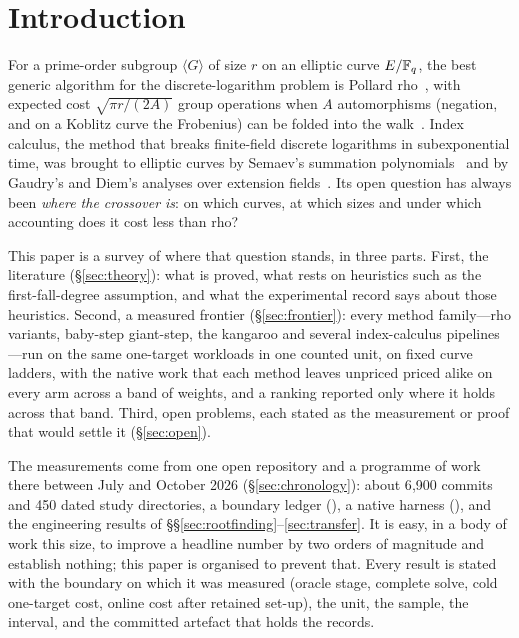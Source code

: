 \section{Introduction}\label{sec:intro}

For a prime-order subgroup $\langle G\rangle$ of size $r$ on an elliptic
curve $E/\mathbb{F}_q$, the best generic algorithm for the discrete-logarithm
problem is Pollard rho~\cite{pollard1978,vanoorschot1999}, with expected
cost $\sqrt{\pi r/(2A)}$ group operations when $A$ automorphisms (negation,
and on a Koblitz curve the Frobenius) can be folded into the
walk~\cite{wiener1998,gallant2000}. Index calculus, the method that breaks
finite-field discrete logarithms in subexponential time, was brought to
elliptic curves by Semaev's summation polynomials~\cite{semaev2004} and by
Gaudry's and Diem's analyses over extension
fields~\cite{gaudry2009,diem2011}. Its open question has always been
\emph{where the crossover is}: on which curves, at which sizes and under
which accounting does it cost less than rho?

This paper is a survey of where that question stands, in three parts.
First, the literature (\S\ref{sec:theory}): what is proved, what rests on
heuristics such as the first-fall-degree assumption, and what the
experimental record says about those heuristics. Second, a measured
frontier (\S\ref{sec:frontier}): every method family---rho variants,
baby-step giant-step, the kangaroo and several index-calculus
pipelines---run on the same one-target workloads in one counted unit, on
fixed curve ladders, with the native work that each method leaves unpriced
priced alike on every arm across a band of weights, and a ranking reported
only where it holds across that band. Third, open problems, each stated as
the measurement or proof that would settle it (\S\ref{sec:open}).

The measurements come from one open repository and a programme of work
there between July and October 2026 (\S\ref{sec:chronology}): about
6{,}900 commits and 450 dated study directories, a boundary ledger
(), a native harness
(), and the engineering results of
\S\S\ref{sec:rootfinding}--\ref{sec:transfer}. It is easy, in a body of
work this size, to improve a headline number by two orders of magnitude
and establish nothing; this paper is organised to prevent that. Every
result is stated with the boundary on which it was measured (oracle stage,
complete solve, cold one-target cost, online cost after retained set-up),
the unit, the sample, the interval, and the committed artefact that holds
the records.

